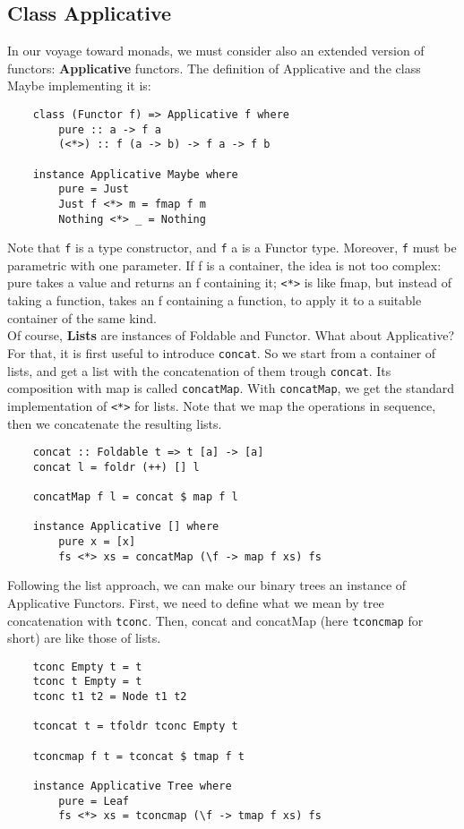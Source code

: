 \subsection{Class Applicative}
In our voyage toward monads, we must consider also an extended version of functors: \textbf{Applicative} functors.
The definition of Applicative and the class Maybe implementing it is:
\begin{lstlisting}
	class (Functor f) => Applicative f where
		pure :: a -> f a
		(<*>) :: f (a -> b) -> f a -> f b
	
	instance Applicative Maybe where
		pure = Just
		Just f <*> m = fmap f m
		Nothing <*> _ = Nothing
\end{lstlisting}
Note that \texttt{f} is a type constructor, and \texttt{f} a is a Functor type.
Moreover, \texttt{f} must be parametric with one parameter.
If f is a container, the idea is not too complex:
pure takes a value and returns an f containing it;
\texttt{<*>} is like fmap, but instead of taking a function, takes an f containing a function, to apply it to a suitable container of the same kind.\\
Of course, \textbf{Lists} are instances of Foldable and Functor. What about Applicative?
For that, it is first useful to introduce \texttt{concat}.
So we start from a container of lists, and get a list with the concatenation of them trough \texttt{concat}.
Its composition with map is called \texttt{concatMap}.
With \texttt{concatMap}, we get the standard implementation of \texttt{<*>} for lists.
Note that we map the operations in sequence, then we concatenate the resulting lists.
\begin{lstlisting}
	concat :: Foldable t => t [a] -> [a]
	concat l = foldr (++) [] l
	
	concatMap f l = concat $ map f l
	
	instance Applicative [] where
		pure x = [x]
		fs <*> xs = concatMap (\f -> map f xs) fs
\end{lstlisting}
Following the list approach, we can make our binary trees an instance of Applicative Functors.
First, we need to define what we mean by tree concatenation with \texttt{tconc}.
Then, concat and concatMap (here \texttt{tconcmap} for short) are like those of lists.
\begin{lstlisting}
	tconc Empty t = t
	tconc t Empty = t
	tconc t1 t2 = Node t1 t2
	
	tconcat t = tfoldr tconc Empty t
	
	tconcmap f t = tconcat $ tmap f t
	
	instance Applicative Tree where
		pure = Leaf
		fs <*> xs = tconcmap (\f -> tmap f xs) fs
\end{lstlisting}

